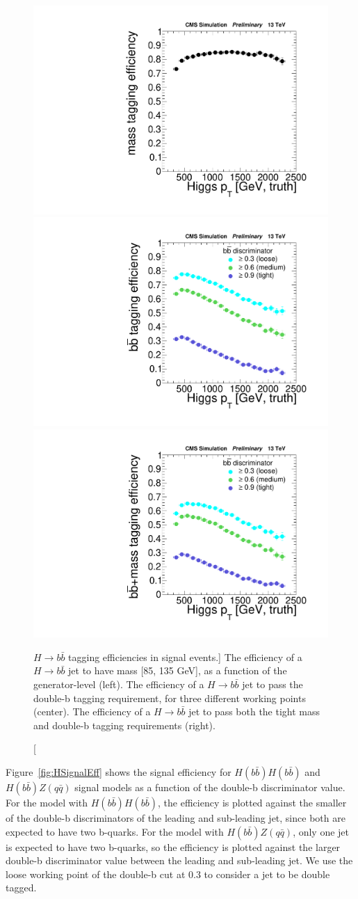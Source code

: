 \begin{figure}
\begin{center}
\includegraphics[width=0.32\linewidth]{figs/ptBinnedMassEff.pdf} 
\includegraphics[width=0.32\linewidth]{figs/doubleBEffH.pdf} 
\includegraphics[width=0.32\linewidth]{figs/doubleBEffMassWindowHmass.pdf}
\caption
[$H\rightarrow b\bar{b}$ tagging efficiencies in signal events.]
{The efficiency of a $H\rightarrow b\bar{b}$ jet to have mass [85, 135 GeV], as a function of the generator-level \pt (left). The efficiency of a $H\rightarrow b\bar{b}$ jet to pass the double-b tagging requirement, for three different working points (center). The efficiency of a $H\rightarrow b\bar{b}$ jet to pass both the tight mass and double-b tagging requirements (right).}
\label{fig:DoubleBEff}
\end{center}
\end{figure}

Figure~\ref{fig:HSignalEff} shows the signal efficiency for $H(b\bar{b})H(b\bar{b})$ and $H(b\bar{b})Z(q\bar{q})$ signal models as a function of the double-b discriminator value. For the model with $H(b\bar{b})H(b\bar{b})$, the efficiency is plotted against the smaller of the double-b discriminators of the leading and sub-leading jet, since both are expected to have two b-quarks. For the model with $H(b\bar{b})Z(q\bar{q})$, only one jet is expected to have two b-quarks, so the efficiency is plotted against the larger double-b discriminator value between the leading and sub-leading jet. We use the loose working point of the double-b cut at 0.3 to consider a jet to be double tagged. 

